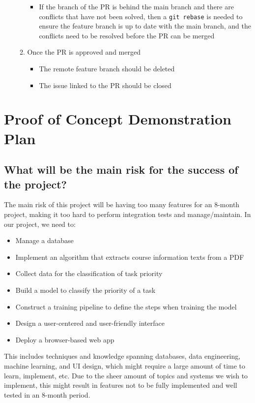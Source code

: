 \documentclass{article}
\begin{document}
\begin{itemize}
\begin{enumerate}
\begin{itemize}
                \item If the branch of the PR is behind the main branch and there are conflicts that have not been solved, then a \texttt{git rebase} is needed to ensure the feature branch is up to date with the main branch, and the conflicts need to be resolved before the PR can be merged
              \end{itemize}
            \item Once the PR is approved and merged
                \begin{itemize}
                    \item The remote feature branch should be deleted
                    \item The issue linked to the PR should be closed 
                \end{itemize}
        \end{enumerate}
\end{itemize}

\section{Proof of Concept Demonstration Plan}

\subsection*{What will be the main risk for the success of the project?} 
    The main risk of this project will be having too many features for an 8-month project, making it too hard to perform integration tests and manage/maintain. 
    In our project, we need to:
    \begin{itemize}
        \item Manage a database
        \item Implement an algorithm that extracts course information texts from a PDF
        \item Collect data for the classification of task priority
        \item Build a model to classify the priority of a task
        \item Construct a training pipeline to define the steps when training the model
        \item Design a user-centered and user-friendly interface
        \item Deploy a browser-based web app
    \end{itemize}
    This includes techniques and knowledge spanning databases, data engineering, machine learning, and UI design, which might require a large amount of time to learn, implement, etc. Due to the sheer amount of topics and systems we wish to implement, this might result in features not to be fully implemented and well tested in an 8-month period.
\end{document}
